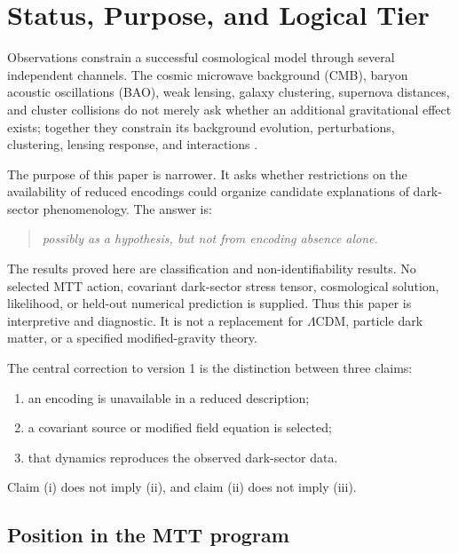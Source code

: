 \documentclass[11pt]{article}
\begin{document}
\section{Status, Purpose, and Logical Tier}

Observations constrain a successful cosmological model through several
independent channels.  The cosmic microwave background (CMB), baryon acoustic
oscillations (BAO), weak lensing, galaxy clustering, supernova distances, and
cluster collisions do not merely ask whether an additional gravitational
effect exists; together they constrain its background evolution, perturbations,
clustering, lensing response, and interactions
\cite{Planck2018CosmologicalParameters,Clowe2006BulletCluster,
DESY3Cosmology,DESIDR2Cosmology}.

The purpose of this paper is narrower.  It asks whether restrictions on the
availability of reduced encodings could organize candidate explanations of
dark-sector phenomenology.  The answer is:
\begin{quote}
\emph{possibly as a hypothesis, but not from encoding absence alone.}
\end{quote}

\begin{remark}
The results proved here are classification and non-identifiability results.
No selected MTT action, covariant dark-sector stress tensor, cosmological
solution, likelihood, or held-out numerical prediction is supplied.  Thus this
paper is interpretive and diagnostic.  It is not a replacement for
$\Lambda$CDM, particle dark matter, or a specified modified-gravity theory.
\end{remark}

The central correction to version 1 is the distinction between three claims:
\begin{enumerate}[label=(\roman*)]
\item an encoding is unavailable in a reduced description;
\item a covariant source or modified field equation is selected;
\item that dynamics reproduces the observed dark-sector data.
\end{enumerate}
Claim (i) does not imply (ii), and claim (ii) does not imply (iii).

\subsection{Position in the MTT program}
\end{document}
